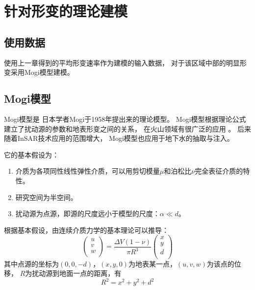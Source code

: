 \chapter{针对形变的理论建模}

\section{使用数据}
使用上一章得到的平均形变速率作为建模的输入数据，
对于该区域中部的明显形变采用Mogi模型建模。

\section{Mogi模型}
Mogi模型\cite{mogiRelationsEruptionsVarious1958}是
日本学者Mogi于1958年提出来的理论模型。
Mogi模型根据理论公式建立了扰动源的参数和地表形变之间的关系，
在火山领域有很广泛的应用
\cite{luSatelliteRadarInterferometry1998,luSyntheticApertureRadar2000,
luMagmaticInflationDormant2002,luInterferometricSyntheticAperture2005,
luGroundSurfaceDeformation2010}。
后来随着InSAR技术应用的范围增大，
Mogi模型也应用于地下水的抽取与注入\cite{zhengWastewaterLeakageWest2019}。

它的基本假设为：
\begin{enumerate}
    \item 介质为各项同性线性弹性介质，可以用剪切模量$\mu$和泊松比$\nu$完全表征介质的特性。
    \item 研究空间为半空间。
    \item 扰动源为点源，即源的尺度远小于模型的尺度：$\alpha \ll d$。
\end{enumerate}

根据基本假设，由连续介质力学的基本理论可以推导：
\begin{equation}
    \left(\begin{array}{c}
        u \\ v \\ w \\
    \end{array}\right)
    =\frac{\Delta V(1-\nu)}{\pi R^3}
    \left(\begin{array}{c}
        x \\ y \\ d \\
    \end{array}\right)
    \label{eq:mogi}
\end{equation}
其中点源的坐标为$(0,0,-d)$，$(x,y,0)$为地表某一点，$(u,v,w)$为该点的位移，
$R$为扰动源到地面一点的距离，有
\begin{equation}
    R^2=x^2+y^2+d^2
\end{equation}

